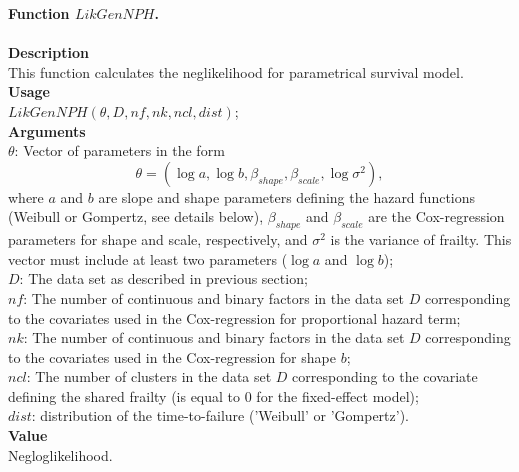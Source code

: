 \documentclass[A4document,12pt]{article}\usepackage[]{graphicx}\usepackage[]{color}
\begin{document}
\noindent
{\textbf{Function $LikGenNPH$.}}
\\\\
\noindent
\textbf{Description}\\
This function calculates the neglikelihood for parametrical survival model.\\
\textbf{Usage}\\
$LikGenNPH(\theta,D,nf,nk,ncl,dist)$;\\
\textbf{Arguments}
\\
\noindent
$\theta$:  Vector of parameters in the form 
\[\theta=(\log a,\log b,\beta _{shape},\beta _{scale},\log \sigma ^2),\]
where $a$ and $b$ are slope and shape parameters defining the hazard functions (Weibull or Gompertz, see details below), $\beta _{shape}$ and $\beta _{scale}$ are the Cox-regression parameters for shape and scale, respectively, and $\sigma ^2$ is the variance of frailty. This vector must include at least two parameters ($\log a$ and $\log b$); 
\\
\noindent
$D$:  The data set as described in previous section;\\
\noindent
$nf$:       The number of continuous and binary factors in the data set $D$ corresponding to the covariates used in the Cox-regression for proportional hazard term;\\
\noindent
$nk$:        The number of continuous and binary factors in the data set $D$ corresponding to the covariates used in the Cox-regression for shape $b$;\\
\noindent
$ncl$:       The number of clusters in the data set $D$ corresponding to the covariate defining the shared frailty (is equal to 0 for the fixed-effect model);\\
\noindent
$dist$:   distribution of the time-to-failure ('Weibull' or 'Gompertz').\\
\textbf{Value}\\
Negloglikelihood.\\
\end{document}
